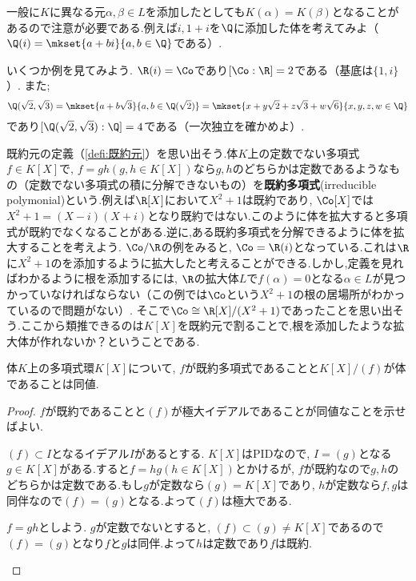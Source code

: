 一般に$K$に異なる元$\alpha,\beta\in L$を添加したとしても$K(\alpha)=K(\beta)$となることがあるので注意が必要である.例えば$i,1+i$を$\Q$に添加した体を考えてみよ（$\Q(i)=\mkset{a+bi}{a,b\in\Q}$である）.

いくつか例を見てみよう. $\R(i)=\Co$であり$[\Co:\R]=2$である（基底は$\{1,i\}$）. また;
\[\Q(\sqrt{2},\sqrt{3})=\mkset{a+b\sqrt{3}}{a,b\in\Q(\sqrt{2})}=\mkset{x+y\sqrt{2}+z\sqrt{3}+w\sqrt{6}}{x,y,z,w\in\Q}\]
であり$[\Q(\sqrt{2},\sqrt{3}):\Q]=4$である（一次独立を確かめよ）.

既約元の定義（\ref{defi:既約元}）を思い出そう.体$K$上の定数でない多項式$f\in K[X]$で, $f=gh (g,h\in K[X])$なら$g,h$のどちらかは定数であるようなもの（定数でない多項式の積に分解できないもの）を\textbf{既約多項式}(irreducible polymonial)という.例えば$\R[X]$において$X^2+1$は既約であり, $\Co[X]$では$X^2+1=(X-i)(X+i)$となり既約ではない.このように体を拡大すると多項式が既約でなくなることがある.逆に,ある既約多項式を分解できるように体を拡大することを考えよう. $\Co/\R$の例をみると, $\Co=\R(i)$となっている.これは$\R$に$X^2+1$のを添加するように拡大したと考えることができる.しかし,定義を見ればわかるように根を添加するには, $\R$の拡大体$L$で$f(\alpha)=0$となる$\alpha\in L$が見つかっていなければならない（この例では$\Co$という$X^2+1$の根の居場所がわかっているので問題がない）.  そこで$\Co\cong\R[X]/(X^2+1)$であったことを思い出そう.ここから類推できるのは$K[X]$を既約元で割ることで,根を添加したような拡大体が作れないか？ということである.

\begin{prop}
	体$K$上の多項式環$K[X]$について, $f$が既約多項式であることと$K[X]/(f)$が体であることは同値.
\end{prop}

\begin{proof}
	$f$が既約であることと$(f)$が極大イデアルであることが同値なことを示せばよい.
	
	\begin{eqv}
		\item $(f)\subset I$となるイデアル$I$があるとする. $K[X]$はPIDなので, $I=(g)$となる$g\in K[X]$がある.すると$f=hg (h\in K[X])$とかけるが, $f$が既約なので$g,h$のどちらかは定数である.もし$g$が定数なら$(g)=K[X]$であり, $h$が定数なら$f,g$は同伴なので$(f)=(g)$となる.よって$(f)$は極大である.
		\item $f=gh$としよう. $g$が定数でないとすると, $(f)\subset(g)\neq K[X]$であるので$(f)=(g)$となり$f$と$g$は同伴.よって$h$は定数であり$f$は既約.
	\end{eqv}
\end{proof}

